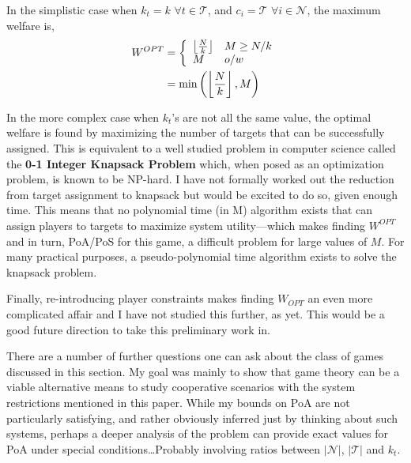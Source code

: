 \documentclass[defaultstyle,12pt]{proposal}
\DeclarePairedDelimiter\floor{\lfloor}{\rfloor}
\def\Pl{\mathcal{N}}  %
\def\Ta{\mathcal{T}}  %
\begin{document}
In the simplistic case when $k_t = k$ $\forall t \in \Ta$, and $c_i = \Ta$ $\forall i \in \Pl$, the maximum welfare is,
\begin{align}
	W^{OPT} & = \left\{
	\begin{array}{ll}
		\floor*{\frac{N}{k}} & M \geq N/k\\
		M & o/w
	\end{array}
	\right.\notag\\
	& = \min\left(\left\lfloor\frac{N}{k}\right\rfloor, M\right)
\end{align}

In the more complex case when $k_t$'s are not all the same value, the optimal welfare is found by maximizing the number of targets that can be successfully assigned. This is equivalent to a well studied problem in computer science called the \textbf{0-1 Integer Knapsack Problem} which, when posed as an optimization problem, is known to be NP-hard. I have not formally worked out the reduction from target assignment to knapsack but would be excited to do so, given enough time. This means that no polynomial time (in M) algorithm exists that can assign players to targets to maximize system utility---which makes finding $W^{OPT}$ and in turn, PoA/PoS for this game, a difficult problem for large values of $M$. For many practical purposes, a pseudo-polynomial time algorithm exists to solve the knapsack problem.

Finally, re-introducing player constraints makes finding $W_{OPT}$ an even more complicated affair and I have not studied this further, as yet. This would be a good future direction to take this preliminary work in.

There are a number of further questions one can ask about the class of games discussed in this section. My goal was mainly to show that game theory can be a viable alternative means to study cooperative scenarios with the system restrictions mentioned in this paper. While my bounds on PoA are not particularly satisfying, and rather obviously inferred just by thinking about such systems, perhaps a deeper analysis of the problem can provide exact values for PoA under special conditions\ldots Probably involving ratios between $|\Pl|$, $|\Ta|$ and $k_t$.




\end{document}

